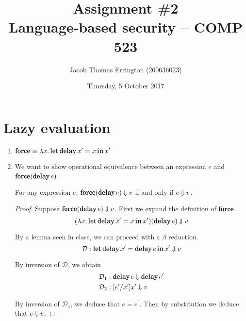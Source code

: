 \documentclass[11pt,letterpaper]{article}
\author{Jacob Thomas Errington (260636023)}
\title{Assignment \#2\\Language-based security -- COMP 523}
\date{Thursday, 5 October 2017}
\DeclareMathOperator{\LetOp}{\mathqd{let}}
\DeclareMathOperator{\InOp}{\mathqd{in}}
\newcommand{\Let}[2]{\LetOp #1 \InOp #2}
\DeclareMathOperator{\DelayOp}{\mathqd{delay}}
\newcommand{\delay}{\DelayOp}
\DeclareMathOperator{\ForceOp}{\mathqd{force}}
\newcommand{\force}{\ForceOp}
\begin{document}
\maketitle

\section{Lazy evaluation}

\begin{enumerate}
  \item
    $\force \equiv \lambda x. \Let{\delay x^\prime = x}{x^\prime}$

  \item
    We want to show operational equivalence between an expression $e$ and
    $\force(\delay e)$.

    \begin{prop}
      For any expression $e$,
      $\force(\delay e) \evalbig v$
      if and only if
      $e \mathbin{\Downarrow} v$.
    \end{prop}

    \begin{proof}
      Suppose $\force(\delay e) \evalbig v$.
      First we expand the definition of $\force$.
      \begin{equation*}
        (\lambda x. \Let{\delay x^\prime = x}{x^\prime}) (\delay e) \evalbig v
      \end{equation*}

      By a lemma\footnotemark{} seen in class, we can proceed with a $\beta$
      reduction.
      \begin{equation*}
        \mathcal{D} : \Let{\delay x^\prime = \delay e}{x^\prime} \evalbig v
      \end{equation*}

      By inversion of $\mathcal{D}$,
      we obtain
      \begin{align*}
        \mathcal{D}_1 &: \delay e \evalbig \delay e^\prime \\
        \mathcal{D}_2 &: [e^\prime/x^\prime]x^\prime \evalbig v
      \end{align*}

      By inversion of $\mathcal{D}_1$, we deduce that $e = e^\prime$.
      Then by substitution we deduce that $e \mathbin{\Downarrow} v$.


\end{proof}
\end{enumerate}
\end{document}

